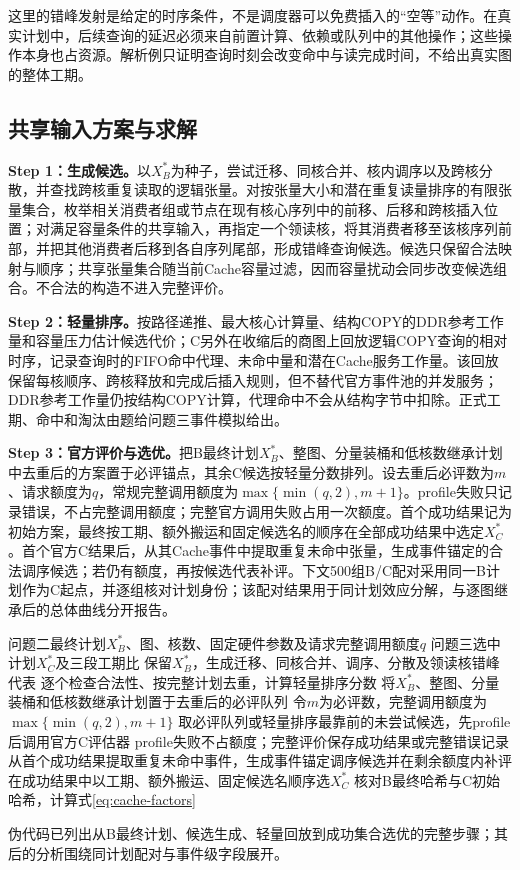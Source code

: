 这里的错峰发射是给定的时序条件，不是调度器可以免费插入的“空等”动作。在真实计划中，后续查询的延迟必须来自前置计算、依赖或队列中的其他操作；这些操作本身也占资源。解析例只证明查询时刻会改变命中与读完成时间，不给出真实图的整体工期。

\subsection{共享输入方案与求解}
\textbf{Step 1：生成候选。}以$X_B^*$为种子，尝试迁移、同核合并、核内调序以及跨核分散，并查找跨核重复读取的逻辑张量。对按张量大小和潜在重复读量排序的有限张量集合，枚举相关消费者组或节点在现有核心序列中的前移、后移和跨核插入位置；对满足容量条件的共享输入，再指定一个领读核，将其消费者移至该核序列前部，并把其他消费者后移到各自序列尾部，形成错峰查询候选。候选只保留合法映射与顺序；共享张量集合随当前Cache容量过滤，因而容量扰动会同步改变候选组合。不合法的构造不进入完整评价。

\textbf{Step 2：轻量排序。}按路径递推、最大核心计算量、结构COPY的DDR参考工作量和容量压力估计候选代价；C另外在收缩后的商图上回放逻辑COPY查询的相对时序，记录查询时的FIFO命中代理、未命中量和潜在Cache服务工作量。该回放保留每核顺序、跨核释放和完成后插入规则，但不替代官方事件池的并发服务；DDR参考工作量仍按结构COPY计算，代理命中不会从结构字节中扣除。正式工期、命中和淘汰由题给问题三事件模拟给出。

\textbf{Step 3：官方评价与选优。}把B最终计划$X_B^*$、整图、分量装桶和低核数继承计划中去重后的方案置于必评锚点，其余C候选按轻量分数排列。设去重后必评数为$m$、请求额度为$q$，常规完整调用额度为$\max\{\min(q,2),m+1\}$。profile失败只记录错误，不占完整调用额度；完整官方调用失败占用一次额度。首个成功结果记为初始方案，最终按工期、额外搬运和固定候选名的顺序在全部成功结果中选定$X_C^*$。首个官方C结果后，从其Cache事件中提取重复未命中张量，生成事件锚定的合法调序候选；若仍有额度，再按候选代表补评。下文500组B/C配对采用同一B计划作为C起点，并逐组核对计划身份；该配对结果用于同计划效应分解，与逐图继承后的总体曲线分开报告。

\begin{algorithm}[H]\caption{问题三候选选择与同计划对照}\label{alg:c-select}
\begin{algorithmic}[1]
\REQUIRE 问题二最终计划$X_B^*$、图、核数、固定硬件参数及请求完整调用额度$q$
\ENSURE 问题三选中计划$X_C^*$及三段工期比
\STATE 保留$X_B^*$，生成迁移、同核合并、调序、分散及领读核错峰代表
\STATE 逐个检查合法性、按完整计划去重，计算轻量排序分数
\STATE 将$X_B^*$、整图、分量装桶和低核数继承计划置于去重后的必评队列
\STATE 令$m$为必评数，完整调用额度为$\max\{\min(q,2),m+1\}$
\STATE 取必评队列或轻量排序最靠前的未尝试候选，先profile后调用官方C评估器
\STATE profile失败不占额度；完整评价保存成功结果或完整错误记录
\ENDWHILE
\STATE 从首个成功结果提取重复未命中事件，生成事件锚定调序候选并在剩余额度内补评
\STATE 在成功结果中以工期、额外搬运、固定候选名顺序选$X_C^*$
\STATE 核对B最终哈希与C初始哈希，计算式\eqref{eq:cache-factors}
\end{algorithmic}\end{algorithm}
伪代码已列出从B最终计划、候选生成、轻量回放到成功集合选优的完整步骤；其后的分析围绕同计划配对与事件级字段展开。

